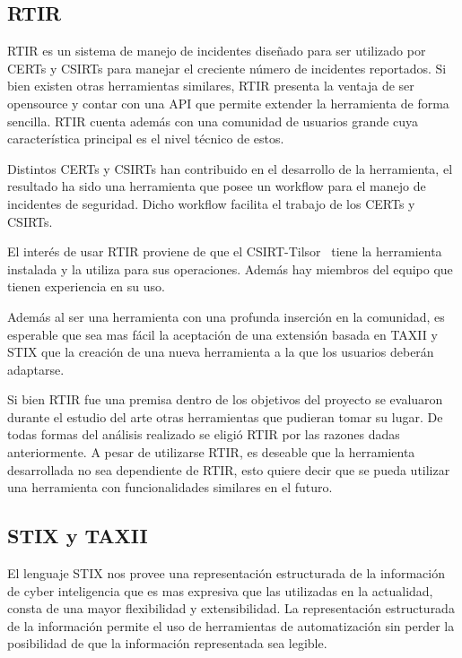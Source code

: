 \documentclass[11pt]{article}
\begin{document}
\subsection{RTIR}

\bigskip

RTIR es un sistema de manejo de incidentes diseñado para ser utilizado por CERTs y CSIRTs para manejar el creciente
número de incidentes reportados. Si bien existen otras herramientas similares, RTIR presenta la ventaja de ser
opensource y contar con una API que permite extender la herramienta de forma sencilla. RTIR cuenta además con una
comunidad de usuarios grande cuya característica principal es el nivel técnico de estos.

Distintos CERTs y CSIRTs han contribuido en el desarrollo de la herramienta, el resultado ha sido una herramienta que
posee un workflow para el manejo de incidentes de seguridad. Dicho workflow facilita el trabajo de los CERTs y CSIRTs.


\bigskip

El interés de usar RTIR proviene de que el CSIRT-Tilsor \ tiene la herramienta instalada y la utiliza para sus
operaciones. Además hay miembros del equipo que tienen experiencia en su uso. 


Además al ser una herramienta con una profunda inserción en la comunidad, es esperable que sea mas fácil la aceptación
de una extensión basada en TAXII y STIX que la creación de una nueva herramienta a la que los usuarios deberán
adaptarse.


\bigskip


\bigskip

Si bien RTIR fue una premisa dentro de los objetivos del proyecto se evaluaron durante el estudio del arte otras
herramientas que pudieran tomar su lugar. De todas formas del análisis realizado se eligió RTIR por las razones dadas
anteriormente.
 A pesar de utilizarse RTIR, es deseable que la herramienta desarrollada no sea dependiente de RTIR, esto quiere decir
que se pueda utilizar una herramienta con funcionalidades similares en el futuro.


\bigskip


\bigskip

\subsection{STIX y TAXII}

\bigskip

El lenguaje STIX nos provee una representación estructurada de la información de cyber inteligencia que es mas expresiva
que las utilizadas en la actualidad, consta de una mayor flexibilidad y extensibilidad. La representación estructurada
de la información permite el uso de herramientas de automatización sin perder la posibilidad de que la información
representada sea legible.
\end{document}
